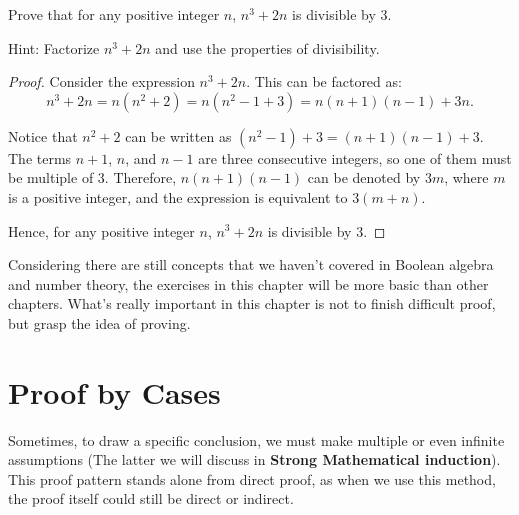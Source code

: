 \documentclass[
	12pt, %
	fleqn, %
	a4paper, %
]{LegrandOrangeBook}
\begin{document}
		\begin{exercise}\label{ex1.3}
			Prove that for any positive integer \( n \), \( n^3 + 2n \) is divisible by 3.
		\end{exercise}
			Hint: Factorize \( n^3 + 2n \) and use the properties of divisibility.
        \begin{proof}
         Consider the expression \( n^3 + 2n \). This can be factored as:
        \[ n^3 + 2n = n(n^2 + 2) = n(n^2 - 1 + 3) = n(n+1)(n-1)+3n. \]
        
        Notice that \( n^2 + 2 \) can be written as \( (n^2 - 1) + 3 = (n+1)(n-1) + 3 \). The terms \( n + 1 \), $n$, and \( n - 1 \) are three consecutive integers, so one of them must be multiple of 3. Therefore, $n(n+1)(n-1)$ can be denoted by $3m$, where $m$ is a positive integer, and the expression is equivalent to $3(m+n)$. 
        
        Hence, for any positive integer \( n \), \( n^3 + 2n \) is divisible by 3.
        
        \end{proof}
    \begin{remark}
        Considering there are still concepts that we haven't covered in Boolean algebra and number theory, the exercises in this chapter will be more basic than other chapters. What's really important in this chapter is not to finish difficult proof, but grasp the idea of proving.
    \end{remark}

\section{Proof by Cases}
    Sometimes, to draw a specific conclusion, we must make multiple or even infinite assumptions (The latter we will discuss in \textbf{Strong Mathematical induction}). This proof pattern stands alone from direct proof, as when we use this method, the proof itself could still be direct or indirect.
\end{document}
